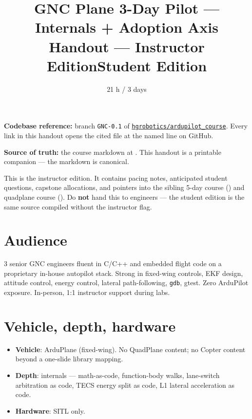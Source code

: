 \documentclass[a4paper,11pt,twoside]{article}
\title{GNC Plane 3-Day Pilot --- Internals + Adoption Axis\\
  \large Handout --- \ifinstructor Instructor Edition\else Student Edition\fi}
\author{\copyrightline}
\date{21 h / 3 days}
\begin{document}
\maketitle

\noindent\textbf{Codebase reference:} branch \texttt{GNC-0.1} of \href{\repourl}{\nolinkurl{hgrobotics/ardupilot_course}}. Every link in this handout opens the cited file at the named line on GitHub.

\noindent\textbf{Source of truth:} the course markdown at . This handout is a printable companion --- the markdown is canonical.

\ifinstructor
\begin{tcolorbox}[colback=red!5!white,colframe=red!40!black,title=Instructor edition]
This is the instructor edition. It contains pacing notes, anticipated student questions, capstone allocations, and pointers into the sibling 5-day course (\siblingplane) and quadplane course (\siblingquadplane). Do \textbf{not} hand this to engineers --- the student edition is the same source compiled without the instructor flag.
\end{tcolorbox}
\fi

\section*{Audience}

3 senior GNC engineers fluent in C/C++ and embedded flight code on a proprietary in-house autopilot stack. Strong in fixed-wing controls, EKF design, attitude control, energy control, lateral path-following, \texttt{gdb}, gtest. Zero ArduPilot exposure. In-person, 1:1 instructor support during labs.

\section*{Vehicle, depth, hardware}
\begin{itemize}
  \item \textbf{Vehicle}: ArduPlane (fixed-wing). No QuadPlane content; no Copter content beyond a one-slide library mapping.
  \item \textbf{Depth}: internals --- math-as-code, function-body walks, lane-switch arbitration as code, TECS energy split as code, L1 lateral acceleration as code.
  \item \textbf{Hardware}: SITL only.
\end{itemize}
\end{document}
